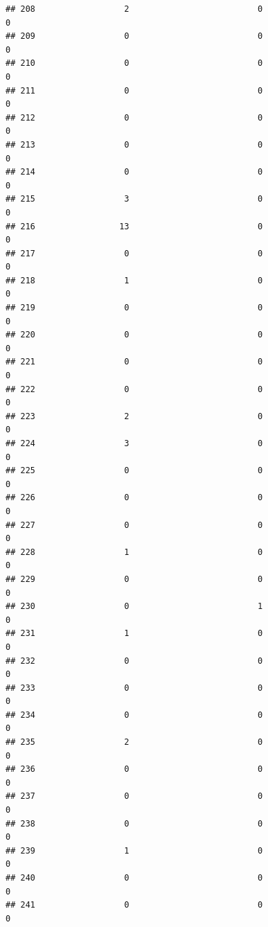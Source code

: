 \documentclass[
]{article}
\begin{document}
\begin{verbatim}
## 208                  2                          0                       0
## 209                  0                          0                       0
## 210                  0                          0                       0
## 211                  0                          0                       0
## 212                  0                          0                       0
## 213                  0                          0                       0
## 214                  0                          0                       0
## 215                  3                          0                       0
## 216                 13                          0                       0
## 217                  0                          0                       0
## 218                  1                          0                       0
## 219                  0                          0                       0
## 220                  0                          0                       0
## 221                  0                          0                       0
## 222                  0                          0                       0
## 223                  2                          0                       0
## 224                  3                          0                       0
## 225                  0                          0                       0
## 226                  0                          0                       0
## 227                  0                          0                       0
## 228                  1                          0                       0
## 229                  0                          0                       0
## 230                  0                          1                       0
## 231                  1                          0                       0
## 232                  0                          0                       0
## 233                  0                          0                       0
## 234                  0                          0                       0
## 235                  2                          0                       0
## 236                  0                          0                       0
## 237                  0                          0                       0
## 238                  0                          0                       0
## 239                  1                          0                       0
## 240                  0                          0                       0
## 241                  0                          0                       0

\end{verbatim}
\end{document}
